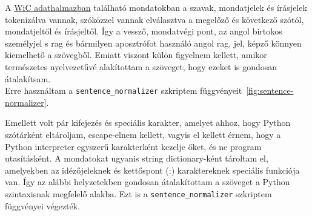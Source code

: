 \documentclass[12pt]{report}
\theoremstyle{definition}
\begin{document}
A \href{https://pilehvar.github.io/wic/package/WiC\_dataset.zip}{WiC adathalmazban} található mondatokban a szavak, mondatjelek és írásjelek tokenizálva vannak, szóközzel vannak elválasztva a megelőző és következő szótól, mondatjeltől és írásjeltől. Így a vessző, mondatvégi pont, az angol birtokos személyjel \textquotesingle s rag és bármilyen aposztrófot használó angol rag, jel, képző könnyen kiemelhető a szövegből. Emiatt viszont külön figyelnem kellett, amikor természetes nyelvezetűvé alakítottam a szöveget, hogy ezeket is gondosan átalakítsam.\\ Erre használtam a \texttt{sentence\_normalizer} szkriptem függvényeit~\ref{fig:sentence-normalizer}.

Emellett volt pár kifejezés és speciális karakter, amelyet ahhoz, hogy Python szótárként eltároljam, escape-elnem kellett, vagyis el kellett érnem, hogy a Python interpreter egyszerű karakterként kezelje őket, és ne program utasításként. A mondatokat ugyanis string dictionary-ként tároltam el, amelyekben az idézőjeleknek és kettőspont (:) karaktereknek speciális funkciója van. Így az alábbi helyzetekben gondosan átalakítottam a szöveget a Python szintaxisnak megfelelő alakba. Ezt is a \texttt{sentence\_normalizer} szkriptem függvényei végezték.

\begin{table}[h]
  \centering
  \caption{A \texttt{sentence\_normalizer} függvény átalakítása}
  \label{tab:transformed_text}
\end{table}
\end{document}
